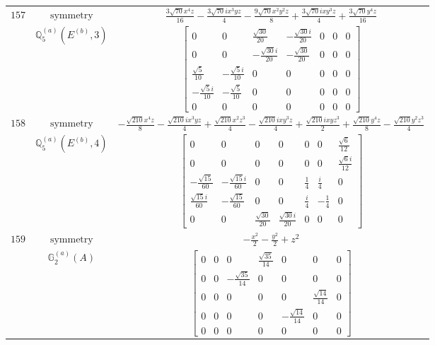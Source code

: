 \documentclass[fleqn,8pt,landscape]{jsarticle}
\begin{document}
\begin{longtable}{ccc}
$ 157 $ & $ \text{symmetry} $ & $ \frac{3 \sqrt{70} x^{4} z}{16} - \frac{3 \sqrt{70} i x^{3} y z}{4} - \frac{9 \sqrt{70} x^{2} y^{2} z}{8} + \frac{3 \sqrt{70} i x y^{3} z}{4} + \frac{3 \sqrt{70} y^{4} z}{16} $ \\
$  $ & $ \mathbb{Q}_{5}^{(a)}(E^{(b)},3) $ & $ \begin{bmatrix} 0 & 0 & \frac{\sqrt{30}}{20} & - \frac{\sqrt{30} i}{20} & 0 & 0 & 0 \\ 0 & 0 & - \frac{\sqrt{30} i}{20} & - \frac{\sqrt{30}}{20} & 0 & 0 & 0 \\ \frac{\sqrt{5}}{10} & - \frac{\sqrt{5} i}{10} & 0 & 0 & 0 & 0 & 0 \\ - \frac{\sqrt{5} i}{10} & - \frac{\sqrt{5}}{10} & 0 & 0 & 0 & 0 & 0 \\ 0 & 0 & 0 & 0 & 0 & 0 & 0 \end{bmatrix} $ \\ \hline
$ 158 $ & $ \text{symmetry} $ & $ - \frac{\sqrt{210} x^{4} z}{8} - \frac{\sqrt{210} i x^{3} y z}{4} + \frac{\sqrt{210} x^{2} z^{3}}{4} - \frac{\sqrt{210} i x y^{3} z}{4} + \frac{\sqrt{210} i x y z^{3}}{2} + \frac{\sqrt{210} y^{4} z}{8} - \frac{\sqrt{210} y^{2} z^{3}}{4} $ \\
$  $ & $ \mathbb{Q}_{5}^{(a)}(E^{(b)},4) $ & $ \begin{bmatrix} 0 & 0 & 0 & 0 & 0 & 0 & \frac{\sqrt{6}}{12} \\ 0 & 0 & 0 & 0 & 0 & 0 & \frac{\sqrt{6} i}{12} \\ - \frac{\sqrt{15}}{60} & - \frac{\sqrt{15} i}{60} & 0 & 0 & \frac{1}{4} & \frac{i}{4} & 0 \\ \frac{\sqrt{15} i}{60} & - \frac{\sqrt{15}}{60} & 0 & 0 & \frac{i}{4} & - \frac{1}{4} & 0 \\ 0 & 0 & \frac{\sqrt{30}}{20} & \frac{\sqrt{30} i}{20} & 0 & 0 & 0 \end{bmatrix} $ \\ \hline
$ 159 $ & $ \text{symmetry} $ & $ - \frac{x^{2}}{2} - \frac{y^{2}}{2} + z^{2} $ \\
$  $ & $ \mathbb{G}_{2}^{(a)}(A) $ & $ \begin{bmatrix} 0 & 0 & 0 & \frac{\sqrt{35}}{14} & 0 & 0 & 0 \\ 0 & 0 & - \frac{\sqrt{35}}{14} & 0 & 0 & 0 & 0 \\ 0 & 0 & 0 & 0 & 0 & \frac{\sqrt{14}}{14} & 0 \\ 0 & 0 & 0 & 0 & - \frac{\sqrt{14}}{14} & 0 & 0 \\ 0 & 0 & 0 & 0 & 0 & 0 & 0 \end{bmatrix} $ \\ \hline

\end{longtable}
\end{document}
